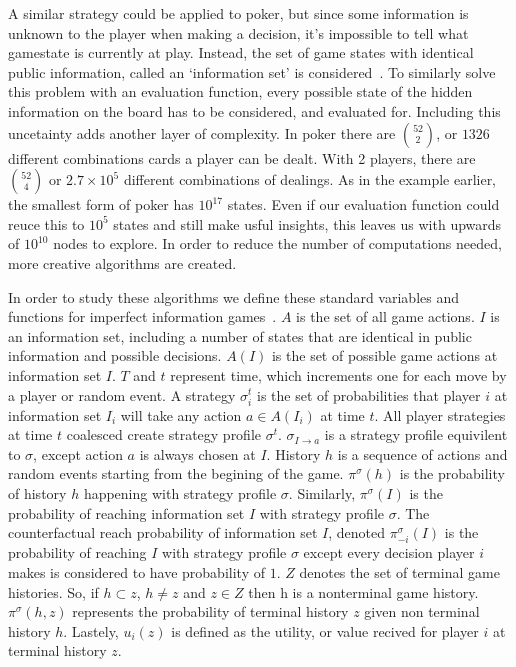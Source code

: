 \documentclass[12pt, letterpaper]{article}
\begin{document}
A similar strategy could be applied to poker, but since some information is unknown to the player when making a decision,
it’s impossible to tell what gamestate is currently at play. Instead, the set of game states with
identical public information, called an ‘information set’ is considered~\cite{cfr-intro}. To similarly solve this
problem with an evaluation function, every possible state of the hidden information on the board has to be considered, and evaluated for.
Including this uncetainty adds another layer of complexity. In poker there are ${52 \choose 2}$, or $1326$ different
combinations cards a player can be dealt. With 2 players, there are ${52 \choose 4}$
or $2.7 \times 10^{5}$ different combinations of dealings.
As in the example earlier, the smallest form of poker has $10^{17}$ states. Even if our evaluation function could reuce this to
$10^{5}$ states and still make usful insights, this leaves us with upwards of $10^{10}$ nodes to explore. In order to reduce the
number of computations needed, more creative algorithms are created.

In order to study these algorithms we define these standard variables and functions for imperfect information games~\cite{cfr-intro}. $A$ is the set of all game actions. $I$ is
an information set, including a number of states that are identical in public information and possible decisions.
$A(I)$ is the set of possible game actions at information set $I$. $T$ and $t$ represent time,
which increments one for each move by a player or random event. A strategy $\sigma^{t}_{i}$ is the set of probabilities that
player $i$ at information set $I_i$ will take any action $a \in A(I_{i})$ at time $t$. All player strategies at time $t$ coalesced 
create strategy profile $\sigma^{t}$. $\sigma_{I\rightarrow a}$ is a strategy profile equivilent to $\sigma$, except
action $a$ is always chosen at $I$.
History $h$ is a sequence of actions and random events starting from the
begining of the game. $\pi^{\sigma}(h)$ is the probability of history $h$ happening with strategy profile $\sigma$.
Similarly, $\pi^{\sigma}(I)$ is the probability of reaching information set $I$ with strategy profile $\sigma$. The counterfactual reach probability of
information set $I$, denoted $\pi^{\sigma}_{-i}(I)$ is the probability of reaching $I$ with strategy
profile $\sigma$ except every decision player $i$ makes is considered to have probability of $1$.
$Z$ denotes the set of terminal game histories. So, if $h \subset z$, $h \neq z$ and $z \in Z$ then h is a nonterminal game history.
$\pi^{\sigma}(h, z)$ represents the probability of terminal history $z$ given non terminal history $h$.
Lastely, $u_{i}(z)$ is defined as the utility, or value recived for player $i$ at terminal history $z$.
\end{document}
